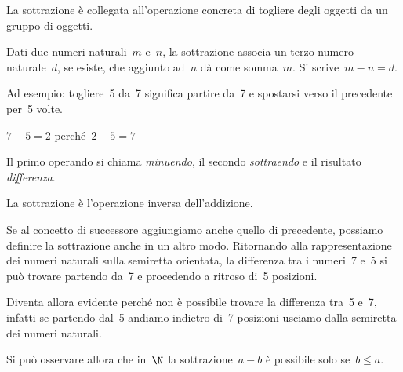 La sottrazione è collegata all'operazione concreta di togliere degli oggetti 
da un gruppo di oggetti.

\begin{definizione}{}{}
Dati due numeri naturali~\(m\) e~\(n\), la sottrazione associa un terzo 
numero 
naturale~\(d\), se esiste, che aggiunto ad~\(n\) dà come somma~\(m\).
Si scrive~\(m - n = d\).
\end{definizione}

Ad esempio: togliere~5 da~7 significa partire da~7 e spostarsi verso il 
precedente per~5 volte.

\begin{minipage}{0.80\textwidth}
 \centering
 \(7-5=2\) perché~\(2+5=7\)

\sotline
%  
\end{minipage}%
\begin{minipage}{0.15\textwidth}
 \centering
\begin{inaccessibleblock}
\end{inaccessibleblock}
\end{minipage}%

Il primo operando si chiama \emph{minuendo}, il secondo \emph{sottraendo} e 
il risultato \emph{differenza}.

La sottrazione è l'operazione inversa dell'addizione.

Se al concetto di successore aggiungiamo anche quello di precedente, 
possiamo definire la sottrazione anche in un altro modo.
Ritornando alla rappresentazione dei numeri naturali sulla semiretta 
orientata, la differenza tra i numeri~7 e~5 si può trovare partendo da~7 e 
procedendo a ritroso di~5 posizioni.

Diventa allora evidente perché non è possibile trovare la differenza 
tra~5 e~7, infatti se partendo dal~5 andiamo indietro di~7 posizioni 
usciamo dalla semiretta dei numeri naturali.

\begin{inaccessibleblock}

\end{inaccessibleblock}

Si può osservare allora che in~\(\N\) la sottrazione~\(a - b\) è possibile 
solo se~\(b\leq a\).

